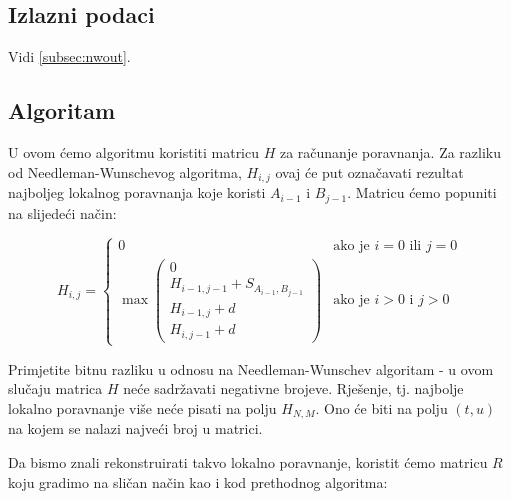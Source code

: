 \documentclass[times, utf8, zavrsni]{fer}
\begin{document}
\subsection{Izlazni podaci}
Vidi \autoref{subsec:nwout}.

\subsection{Algoritam}
\label{subsec:swalg}
U ovom ćemo algoritmu koristiti matricu $H$ za računanje poravnanja.
Za razliku od Needleman-Wunschevog algoritma, $H_{i,j}$ ovaj će put
označavati rezultat
najboljeg lokalnog poravnanja koje koristi $A_{i-1}$ i $B_{j-1}$.
Matricu ćemo popuniti na slijedeći način:

$$
H_{i,j} =
\left\{ \begin{array}{ll}
	0 & \mbox{ako je } i=0 \mbox{ ili } j=0 \\
	\max \left( \begin{array}{l}
		0 \\
		H_{i-1,j-1} + S_{A_{i-1}, B_{j-1}} \\
		H_{i-1, j} + d \\
		H_{i, j-1} + d
	\end{array} \right) & \mbox{ako je } i>0 \mbox{ i } j>0
\end{array} \right.
$$

Primjetite bitnu razliku u odnosu na Needleman-Wunschev algoritam - u ovom
slučaju matrica $H$ neće sadržavati negativne brojeve. Rješenje, tj. najbolje
lokalno poravnanje više neće pisati na polju $H_{N, M}$. Ono će biti na polju 
$(t, u)$ na kojem se nalazi najveći broj u matrici.

Da bismo znali rekonstruirati takvo lokalno poravnanje, koristit ćemo matricu
$R$ koju gradimo na sličan način kao i kod prethodnog algoritma:
\end{document}
